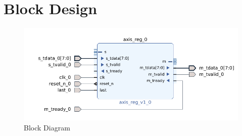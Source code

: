 \documentclass{article}
\begin{document}
\section{Block Design}
\vspace{1cm}
\begin{figure}[h]
    \centering
\includegraphics[width=\columnwidth]{figs/p2ipbd.png}
    \caption{Block Diagram}
    \label{fig:my_label}
\end{figure}
\vspace{13cm}
\end{document}
